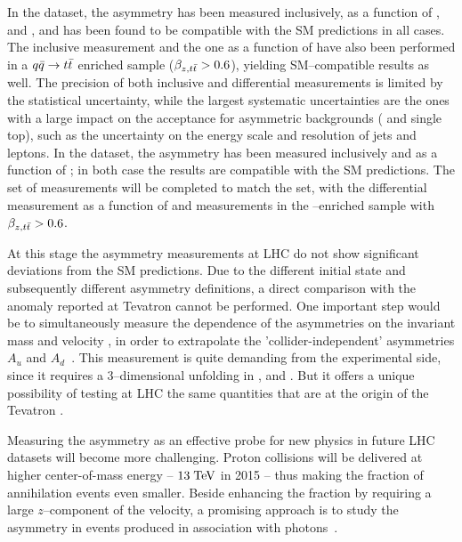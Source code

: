 In the \seventev{} dataset, the asymmetry \ac{} has been measured
inclusively, as a function of \mtt{}, \pttt{} and \ytt{}, and has been found
to be compatible with the SM predictions in all cases. The inclusive
measurement and the one as a function of \mtt{} have also been performed in
a $q\bar{q}{}\to t\bar{t}{}$ enriched sample ($\beta_{z,t\bar{t}}{}>0.6$), yielding
SM--compatible results as well. The precision of both inclusive and
differential measurements is limited by the statistical uncertainty,
while the largest systematic uncertainties are the ones with a large
impact on the acceptance for asymmetric backgrounds (\wjets{} and
single top), such as the uncertainty on the energy scale and
resolution of jets and leptons.
In the \eighttev{} dataset, the asymmetry \ac{} has been measured
inclusively and as a function of \mtt{}; in both case the results are
compatible with the SM predictions. The set of measurements will be
completed to match the \seventev{} set, with the differential
measurement as a function of \pttt{} and measurements in the
\qqbar{}--enriched sample with $\beta_{z,t\bar{t}}{}>0.6$.

At this stage the asymmetry measurements at LHC do not show
significant deviations from the SM predictions. Due to the different
initial state and subsequently different asymmetry definitions, a direct comparison
with the anomaly reported at Tevatron cannot be performed. One
important step would be to simultaneously measure the dependence of
the asymmetries on the \ttbar{} invariant mass \mtt{} and velocity
\betatt{}, in order to extrapolate the 'collider-independent'
asymmetries $A_u$ and $A_d$~\cite{AguilarSaavedra:2012va}. This
measurement is quite demanding from the experimental side, since it
requires a 3--dimensional unfolding in \mtt{}, \betatt{} and
\dy{}. But it offers a unique possibility of testing at LHC the same
quantities that are at the origin of the Tevatron \afb{}. 

Measuring the asymmetry \ac{} as an effective probe for new physics in
future LHC datasets will become more challenging. Proton collisions
will be delivered at higher center-of-mass energy -- $13\; \mathrm{TeV}{}$ in
2015 -- thus making the fraction of \qqbar{} annihilation events even
smaller. Beside enhancing the \qqbar{} fraction by requiring a large
$z$--component of the \ttbar{} velocity, a promising approach is to
study the asymmetry in \ttbar{} events produced in association with
photons~\cite{Aguilar-Saavedra:2014vta}. 
